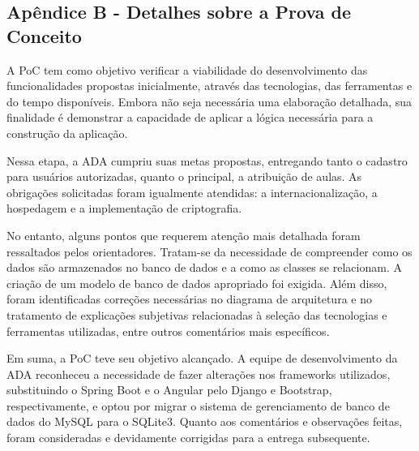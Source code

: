 \documentclass[12pt]{article}
\begin{document}
\subsection{Apêndice B - Detalhes sobre a Prova de Conceito} 
\par A PoC tem como objetivo verificar a viabilidade do desenvolvimento das funcionalidades propostas inicialmente, através das tecnologias, das ferramentas e do tempo disponíveis. Embora não seja necessária uma elaboração detalhada, sua finalidade é demonstrar a capacidade de aplicar a lógica necessária para a construção da aplicação.
\par Nessa etapa, a ADA cumpriu suas metas propostas, entregando tanto o cadastro para usuários autorizadas, quanto o principal, a atribuição de aulas. As obrigações solicitadas foram igualmente atendidas: a internacionalização, a hospedagem e a implementação de criptografia. 
\par No entanto, alguns pontos que requerem atenção mais detalhada foram ressaltados pelos orientadores. Tratam-se da necessidade de compreender como os dados são armazenados no banco de dados e a como as classes se relacionam. A criação de um modelo de banco de dados apropriado foi exigida. Além disso, foram identificadas correções necessárias no diagrama de arquitetura e no tratamento de explicações subjetivas relacionadas à seleção das tecnologias e ferramentas utilizadas, entre outros comentários mais específicos.
\par Em suma, a PoC teve seu objetivo alcançado. A equipe de desenvolvimento da ADA reconheceu a necessidade de fazer alterações nos frameworks utilizados, substituindo o Spring Boot e o Angular pelo Django e Bootstrap, respectivamente, e optou por migrar o sistema de gerenciamento de banco de dados do MySQL para o SQLite3. Quanto aos comentários e observações feitas, foram consideradas e devidamente corrigidas para a entrega subsequente.
\end{document}

